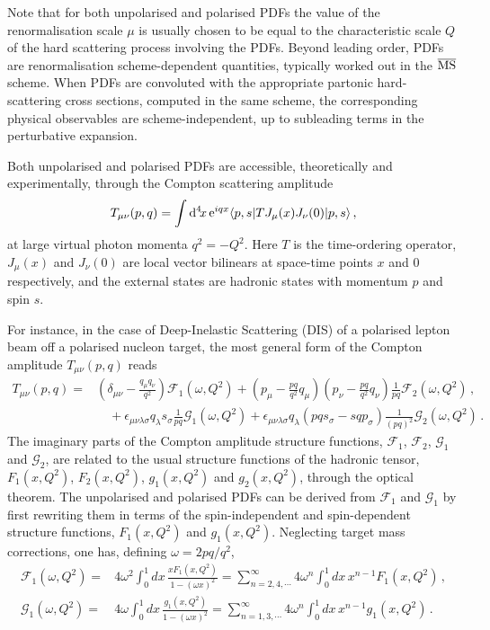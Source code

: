 Note that for both unpolarised and polarised PDFs the value of the 
renormalisation scale $\mu$ is usually chosen to be equal to the characteristic 
scale $Q$ of the hard scattering process involving the PDFs.
%
Beyond leading order, PDFs are renormalisation scheme-dependent 
quantities, typically worked out in the $\overline{\rm MS}$ scheme.
%
When PDFs are convoluted with the appropriate partonic hard-scattering 
cross sections, computed in the same scheme, the corresponding physical 
observables are scheme-independent, up to subleading terms in the perturbative 
expansion. 

Both unpolarised and polarised PDFs are accessible, theoretically and 
experimentally, through the Compton scattering amplitude
\begin{equation}
\label{eq:Compton}
T_{\mu\nu}(p,q) 
= 
\int {\rm d}^4\!x\, {\rm e}^{iqx}  \langle p,s |T J_\mu(x) J_\nu(0)|p,s\rangle\, ,
\end{equation}
at large virtual photon momenta $q^2=-Q^2$. 
%
Here $T$ is the time-ordering operator, $J_\mu(x)$ and $J_\nu(0)$ are local 
vector bilinears at space-time points $x$ and $0$ respectively, and the 
external states are hadronic states with momentum $p$ and spin $s$.

For instance, in the case of Deep-Inelastic Scattering (DIS) of a 
polarised lepton beam off a polarised nucleon target, the 
most general form of the Compton amplitude $T_{\mu\nu}(p,q)$ reads
\begin{align}
T_{\mu\nu}(p,q) 
= {} & 
  \left(\delta_{\mu\nu}-\frac{q_\mu q_\nu}{q^2}\right)\mathcal{F}_1(\omega,Q^2) 
+ \left(p_\mu-\frac{pq}{q^2}q_\mu\right) \left(p_\nu-\frac{pq}{q^2}q_\nu\right) \frac{1}{pq} \mathcal{F}_2(\omega,Q^2)\,,\\ 
& {} \quad  
+ \epsilon_{\mu\nu\lambda\sigma}q_\lambda s_\sigma \frac{1}{pq}\mathcal{G}_1(\omega,Q^2)
+ \epsilon_{\mu\nu\lambda\sigma}q_\lambda \left(pq s_\sigma - sq p_\sigma\right) \frac{1}{(pq)^2}\mathcal{G}_2(\omega,Q^2)\,.
\end{align}
%
The imaginary parts of the Compton amplitude structure functions, 
$\mathcal{F}_1$, $\mathcal{F}_2$, $\mathcal{G}_1$ and $\mathcal{G}_2$, 
are related to the usual structure functions of the hadronic tensor, 
$F_1(x,Q^2)$, $F_2(x,Q^2)$, $g_1(x,Q^2)$ and $g_2(x,Q^2)$, 
through the optical theorem.
%
The unpolarised and polarised PDFs can be derived from $\mathcal{F}_1$ and 
$\mathcal{G}_1$ by first rewriting them in terms of the spin-independent 
and spin-dependent structure functions, $F_1(x,Q^2)$ and $g_1(x,Q^2)$.
%
Neglecting target mass corrections, one has, defining $\omega=2pq/q^2$,
\begin{align}
\mathcal{F}_1(\omega,Q^2) 
= {} & 4 \omega^2 \int_0^1 dx\,  \frac{xF_1(x,Q^2)}{1-(\omega x)^2} 
= \sum_{n=2,4,\cdots}^\infty 4\omega^n \int_0^1 dx\, x^{n-1} F_1(x,Q^2) \,, \\
\mathcal{G}_1(\omega,Q^2) 
= {} & 4 \omega \int_0^1 dx\, \frac{g_1(x,Q^2)}{1-(\omega x)^2} 
= \sum_{n=1,3,\cdots}^\infty 4\omega^n \int_0^1 dx\, x^{n-1} g_1(x,Q^2)\,.
\end{align}
%

